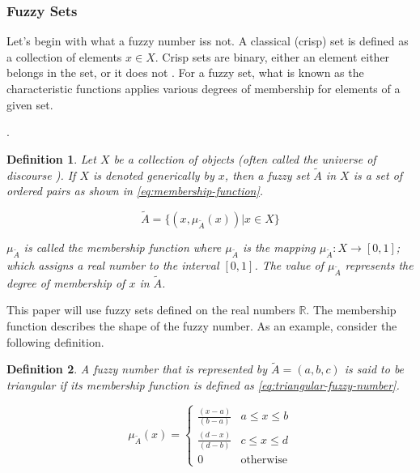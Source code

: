 \documentclass[11pt,a4paper,final]{article}
\newtheorem{definition}{Definition}[section]
\begin{document}
\subsubsection{Fuzzy Sets}
\label{sec:org77258f9}
Let's begin with what a fuzzy number iss
not. A classical (crisp) set is defined as a collection of elements \(x \in X\). Crisp sets are binary, either an element
either belongs in the set, or it does not \cite{zimmermann-2001-fuzzy-set}. For a fuzzy set, what is known as the
characteristic functions applies various degrees of membership for elements of a given set.

\cite{zimmermann-2001-fuzzy-set}.
\begin{definition}
Let \(X\) be a collection of objects (often called the universe of discourse \cite{bello-2019-fuzzy-activ}). If \(X\) is denoted
generically by \(x\), then a fuzzy set \(\tilde{A}\) in \(X\) is a set of ordered pairs as shown in \autoref{eq:membership-function}.

\begin{equation}
\label{eq:membership-function}
\tilde{A} = \{(x, \mu_{\tilde{A}}(x))| x\in X\}
\end{equation}

\noindent
\(\mu_{\tilde{A}}\) is called the membership function where \(\mu_{\tilde{A}}\) is the mapping \(\mu_{\tilde{A}} : X \rightarrow
[0,1]\); which assigns a real number to the interval \([0,1]\). The value of \(\mu_{\tilde{A}}\) represents the degree of
membership of \(x\) in \(\tilde{A}\).
\end{definition}

This paper will use fuzzy sets defined on the real numbers \(\mathbb{R}\). The membership function describes the shape of
the fuzzy number. As an example, consider the following definition.

\begin{definition}
A fuzzy number that is represented by \(\tilde{A} = (a,b,c)\) is said to be triangular if its membership function is
defined as \autoref{eq:triangular-fuzzy-number}.

\begin{equation}
\label{eq:triangular-fuzzy-number}
  \mu_{\tilde{A}}(x) =
  \begin{cases}
    \frac{(x-a)}{(b-a)} & a \le x \le b \\
    \frac{(d-x)}{(d-b)} & c \le x \le d \\
    0                   & \text{otherwise}
  \end{cases}
\end{equation}
\end{definition}
\end{document}
